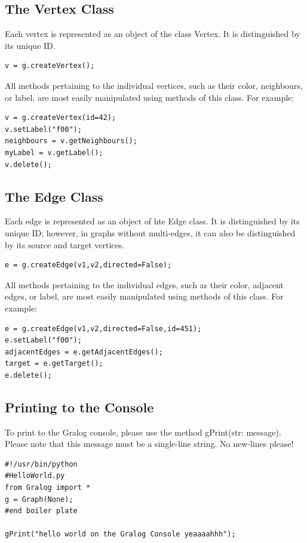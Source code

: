 \subsection{The Vertex Class}
Each vertex is represented as an object of the class Vertex. It is distinguished by its unique ID. 

\begin{lstlisting}
v = g.createVertex();
\end{lstlisting}

All methods pertaining to the individual vertices, such as their color, neighbours, or label, are most easily manipulated using methods of this class. For example:

\begin{lstlisting}
v = g.createVertex(id=42);
v.setLabel("f00");
neighbours = v.getNeighbours();
myLabel = v.getLabel();
v.delete();
\end{lstlisting}

\subsection{The Edge Class}
Each edge is represented as an object of hte Edge class. It is distinguished by its unique ID; however, in graphs without multi-edges, it can also be distinguished by its source and target vertices.

\begin{lstlisting}
e = g.createEdge(v1,v2,directed=False);
\end{lstlisting}

All methods pertaining to the individual edges, such as their color, adjacent edges, or label, are most easily manipulated using methods of this class. For example:

\begin{lstlisting}
e = g.createEdge(v1,v2,directed=False,id=451);
e.setLabel("f00");
adjacentEdges = e.getAdjacentEdges();
target = e.getTarget();
e.delete();
\end{lstlisting}

\subsection{Printing to the Console}
To print to the Gralog console, please use the method gPrint(str: message). Please note that this message must be a single-line string. No new-lines please!

\begin{lstlisting}
#!/usr/bin/python
#HelloWorld.py
from Gralog import *
g = Graph(None);
#end boiler plate

gPrint("hello world on the Gralog Console yeaaaahhh");
\end{lstlisting}

